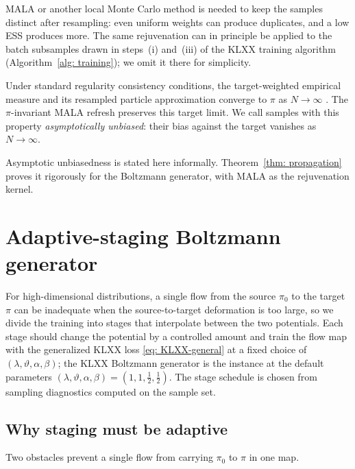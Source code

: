 \documentclass{article}
\begin{document}
\begin{remark}
	MALA or another local Monte Carlo method is needed to keep the samples distinct after resampling: even uniform weights can produce duplicates, and a low ESS produces more. The same rejuvenation can in principle be applied to the batch subsamples drawn in steps~(i) and~(iii) of the KLXX training algorithm (Algorithm~\ref{alg: training}); we omit it there for simplicity.
\end{remark}

Under {\color{blue}standard regularity consistency conditions}, the target-weighted empirical measure and its resampled particle approximation converge to $\pi$ as $N\to\infty$ \citep{liu2001monte,doucet2001introduction}. The $\pi$-invariant MALA refresh preserves this target limit. We call samples with this property \emph{asymptotically unbiased}: their bias against the target vanishes as $N\to\infty$.

\begin{remark}
{\color{purple}Asymptotic unbiasedness is stated here informally. Theorem~\ref{thm: propagation} proves it rigorously for the Boltzmann generator, with MALA as the rejuvenation kernel.}
\end{remark}

\section{Adaptive-staging Boltzmann generator}
\label{sec: boltzmann}

For high-dimensional distributions, a single flow from the source $\pi_0$ to the target $\pi$ can be inadequate when the source-to-target deformation is too large, so we divide the training into stages that interpolate between the two potentials. Each stage should change the potential by a controlled amount and train the flow map with the generalized KLXX loss \eqref{eq: KLXX-general} at a fixed choice of $(\lambda,\vartheta,\alpha,\beta)$; the KLXX Boltzmann generator is the instance at the default parameters $(\lambda,\vartheta,\alpha,\beta)=(1,1,\frac12,\frac12)$. The stage schedule is chosen from sampling diagnostics computed on the sample set.

\subsection{Why staging must be adaptive}

Two obstacles prevent a single flow from carrying $\pi_0$ to $\pi$ in one map.
\end{document}
